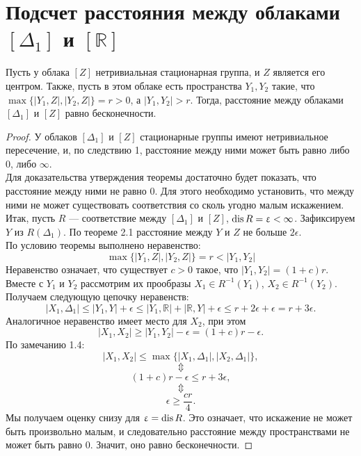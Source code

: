 
\section{Подсчет расстояния между облаками $[\Delta_1]$ и $[\mathbb{R}]$}

\begin{theorem} Пусть у облака $[Z]$ нетривиальная стационарная группа, и $Z$
является его центром. Также, пусть в этом облаке есть пространства $Y_{1}, Y_{2}$
такие, что $\max\big\{ |Y_{1},Z|, |Y_{2}, Z| \big\} = r>0$, а
$|Y_{1}, Y_{2}|>r$. Тогда, расстояние между облаками $[\Delta_1]$ и $[Z]$
равно бесконечности.
\end{theorem} 
\begin{proof} У облаков $[\Delta_1]$ и $[Z]$ стационарные группы имеют
нетривиальное пересечение, и, по следствию 1, расстояние между ними может быть
равно либо $0$, либо $\infty$. \\ Для доказательства утверждения теоремы
достаточно будет показать, что расстояние между ними не равно $0$.  Для этого
необходимо установить, что между ними не может существовать соответствия со
сколь угодно малым искажением. Итак, пусть $R$ --- соответствие между
$[\Delta_1]$ и $[Z]$, $\operatorname{dis} R = \upvarepsilon < \infty$.
Зафиксируем $Y$ из $R(\Delta_1)$. По теореме 2.1 расстояние между $Y$ и $Z$ не
больше $2\epsilon$.\\ По условию теоремы выполнено неравенство:
 $$\max\big\{ |Y_{1},Z|, |Y_{2}, Z| \big\} = r < |Y_{1}, Y_{2}|$$
Неравенство означает, что существует $c > 0$ такое, что
$|Y_{1},Y_{2}| = (1 + c)r.$ \\ Вместе с $Y_{1}$ и
$ Y_{2}$ рассмотрим их прообразы $X_1 \in R^{-1}(Y_{1})$,
$ X_2 \in R^{-1}(Y_{2})$.  \\ Получаем следующую цепочку
неравенств:
	$$|X_1, \Delta_1| \le |Y_{1}, Y| + \epsilon \le |Y_{1}, \mathbb{R}| + |\mathbb{R}, Y| +\epsilon \le r + 2\epsilon + \epsilon = r + 3\epsilon.$$
	Аналогичное неравенство имеет место для $X_2$, при этом
	$$|X_1, X_2|  \ge |Y_{1}, Y_{2}| - \epsilon = (1+c)r - \epsilon.$$
	По замечанию 1.4:
	$$|X_1, X_2| \le \max\big\{ |X_1, \Delta_1|, |X_2, \Delta_1| \big\},$$
	$$\Updownarrow$$
	$$(1+c)r - \epsilon\le r + 3\epsilon,$$
	$$\Updownarrow$$
	$$\epsilon \ge \frac{cr}{4}.$$
	Мы получаем оценку снизу для $\upvarepsilon = \operatorname{dis} R$. Это означает, что
искажение не может быть произвольно малым, и следовательно расстояние между
пространствами не может быть равно 0. Значит, оно равно бесконечности.
	
\end{proof}

